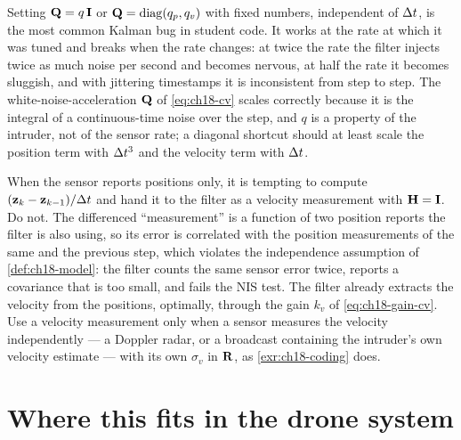 \begin{pitfall}
Setting $\mathbf{Q}=q\,\mathbf{I}$ or $\mathbf{Q}=\operatorname{diag}(q_p,q_v)$ with fixed numbers,
independent of $\Delta t$, is the most common Kalman bug in student code. It
works at the rate at which it was tuned and breaks when the rate changes: at
twice the rate the filter injects twice as much noise per second and becomes
nervous, at half the rate it becomes sluggish, and with jittering timestamps
it is inconsistent from step to step. The white-noise-acceleration $\mathbf{Q}$
of \cref{eq:ch18-cv} scales correctly because it is the integral of a
continuous-time noise over the step, and $q$ is a property of the intruder,
not of the sensor rate; a diagonal shortcut should at least scale the
position term with $\Delta t^3$ and the velocity term with $\Delta t$.
\end{pitfall}

\begin{pitfall}
When the sensor reports positions only, it is tempting to compute
$(\mathbf{z}_k-\mathbf{z}_{k-1})/\Delta t$ and hand it to the filter as a velocity
measurement with $\mathbf{H}=\mathbf{I}$. Do not. The differenced ``measurement''
is a function of two position reports the filter is also using, so its error
is correlated with the position measurements of the same and the previous
step, which violates the independence assumption of \cref{def:ch18-model}:
the filter counts the same sensor error twice, reports a covariance that is
too small, and fails the NIS test. The filter already extracts the velocity
from the positions, optimally, through the gain $k_v$ of
\cref{eq:ch18-gain-cv}. Use a velocity measurement only when a sensor
measures the velocity independently --- a Doppler radar, or a broadcast
containing the intruder's own velocity estimate --- with its own $\sigma_v$
in $\mathbf{R}$, as \cref{exr:ch18-coding} does.
\end{pitfall}

\section{Where this fits in the drone system}
\label{sec:ch18-drone}

